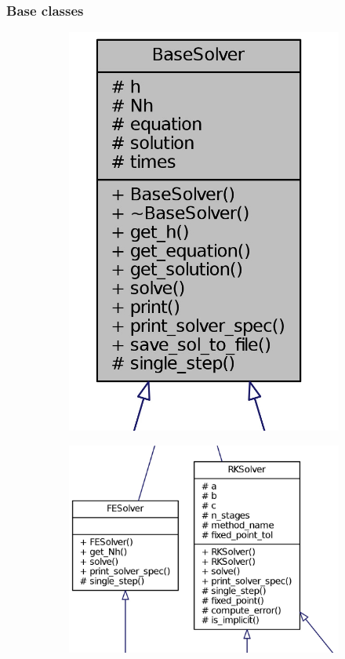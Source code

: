 \documentclass{beamer}
\begin{document}
\begin{frame} %
	\frametitle{Base classes}
	\begin{figure}
		\begin{subfigure}{.5\textwidth}
			\begin{center}
				\includegraphics[width=0.5 \linewidth]{etc/classes_base.jpg}
			\end{center}
		\end{subfigure}%
		\begin{subfigure}{.5\textwidth}
			\includegraphics[width=\linewidth]{etc/classes_plain.jpg}
		\end{subfigure}
	\end{figure}
\end{frame}
\end{document}
